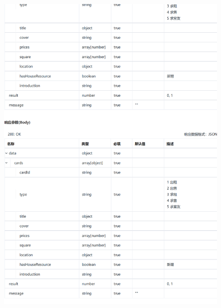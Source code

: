     \begin{figure}[h]
        \centering
        \includegraphics[height=17.0cm,width=14.0cm]{design/image/api6.png} 
        \end{figure}    
    \newpage    
